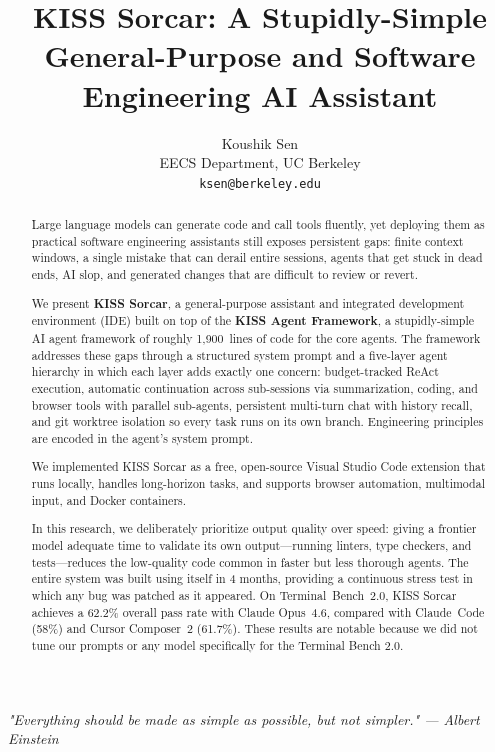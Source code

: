 \documentclass{article}
\title{KISS Sorcar: A Stupidly-Simple General-Purpose and Software Engineering AI Assistant}
\author{%
Koushik Sen \\ EECS Department, UC Berkeley\\ \texttt{ksen@berkeley.edu} \\ }
\begin{document}
\maketitle

\begin{center}
\textit{"Everything should be made as simple as possible, but not simpler." — Albert Einstein}
\end{center}


\begin{abstract}
Large language models can generate code and call tools fluently, yet deploying them as practical software engineering assistants still exposes persistent gaps: finite context windows, a single mistake that can derail entire sessions, agents that get stuck in dead ends, AI slop, and generated changes that are difficult to review or revert.

We present \textbf{KISS Sorcar}, a general-purpose assistant and integrated development environment (IDE) built on top of the \textbf{KISS Agent Framework}, a stupidly-simple AI agent framework of roughly 1,900~lines of code for the core agents.  The framework addresses these gaps through a structured system prompt and a five-layer agent hierarchy in which each layer adds exactly one concern: budget-tracked ReAct execution, automatic continuation across sub-sessions via summarization, coding, and browser tools with parallel sub-agents, persistent multi-turn chat with history recall, and git worktree isolation so every task runs on its own branch.  Engineering principles are encoded in the agent's system prompt.

We implemented KISS Sorcar as a free, open-source Visual Studio Code extension that runs locally, handles long-horizon tasks, and supports browser automation, multimodal input, and Docker containers.

In this research, we deliberately prioritize output quality over speed:  giving a frontier model adequate time to validate its own output---running linters, type checkers, and tests---reduces the low-quality code common in faster but less thorough agents.  The entire system was built using itself in 4 months, providing a continuous stress test in which any bug was patched as it appeared.  On Terminal~Bench~2.0, KISS Sorcar achieves a 62.2\% overall pass rate with Claude Opus~4.6, compared with Claude~Code (58\%) and Cursor Composer~2 (61.7\%).  These results are notable because we did not tune our prompts or any model specifically for the Terminal Bench 2.0.
\end{abstract}
\end{document}
